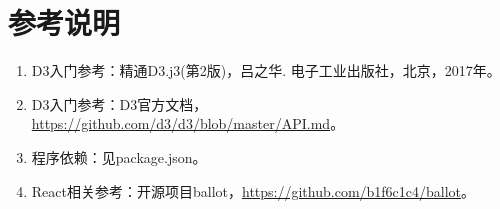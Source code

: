 \documentclass[a4paper,12pt]{article}
\begin{document}
    \label{applastpage}
    \newpage
    \appendix
    \section{参考说明}
    \begin{enumerate}
      \item D3入门参考：精通D3.j3(第2版)，吕之华. 电子工业出版社，北京，2017年。
      \item D3入门参考：D3官方文档，\url{https://github.com/d3/d3/blob/master/API.md}。
      \item 程序依赖：见package.json。
      \item React相关参考：开源项目ballot，\url{https://github.com/b1f6c1c4/ballot}。
    \end{enumerate}
\iffalse
\begin{itemize}[noitemsep,topsep=0pt]
\end{itemize}
\begin{enumerate}[label=\Roman{*}.,noitemsep,topsep=0pt]
\end{enumerate}
\begin{multicols}{2}
\end{multicols}
\fi
\end{document}
